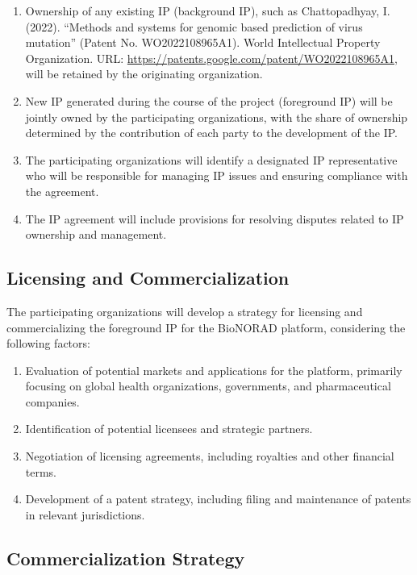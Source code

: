 \documentclass[onecolumn, compsoc,12pt]{IEEEtran}
\begin{document}
\begin{enumerate}
    \item Ownership of any existing IP (background IP), such as Chattopadhyay, I. (2022). ``Methods and systems for genomic based prediction of virus mutation'' (Patent No. WO2022108965A1). World Intellectual Property Organization. URL: \url{https://patents.google.com/patent/WO2022108965A1}, will be retained by the originating organization.
    \item New IP generated during the course of the project (foreground IP) will be jointly owned by the participating organizations, with the share of ownership determined by the contribution of each party to the development of the IP.
    \item The participating organizations will identify a designated IP representative who will be responsible for managing IP issues and ensuring compliance with the agreement.
    \item The IP agreement will include provisions for resolving disputes related to IP ownership and management.
\end{enumerate}

\subsection{Licensing and Commercialization}
The participating organizations will develop a strategy for licensing and commercializing the foreground IP for the BioNORAD platform, considering the following factors:

\begin{enumerate}
    \item Evaluation of potential markets and applications for the platform, primarily focusing on global health organizations, governments, and pharmaceutical companies.
    \item Identification of potential licensees and strategic partners.
    \item Negotiation of licensing agreements, including royalties and other financial terms.
    \item Development of a patent strategy, including filing and maintenance of patents in relevant jurisdictions.
\end{enumerate}

\subsection{Commercialization Strategy}
\end{document}
